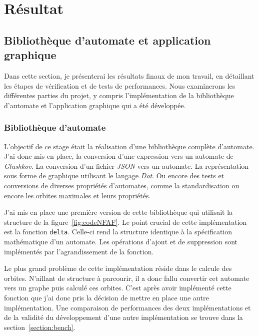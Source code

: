 \section{Résultat}

\subsection{Bibliothèque d'automate et application graphique}

Dans cette section, je présenterai les résultats finaux de mon travail, en
détaillant les étapes de vérification et de tests de performances. Nous
examinerons les différentes parties du projet, y compris l'implémentation de la    
bibliothèque d'automate et l'application graphique qui a été développée.

\subsubsection{Bibliothèque d'automate}

L'objectif de ce stage était la réalisation d'une bibliothèque complète
d'automate. J'ai donc mis en place, la conversion d'une expression vers un
automate de \textit{Glushkov}. La conversion d'un fichier \textit{JSON} vers un
automate. La représentation sous forme de graphique utilisant le langage
\textit{Dot}. Ou encore des tests et conversions de diverses propriétés
d'automates, comme la standardisation ou encore les orbites maximales et leurs
propriétés.

\vphantom{}

J'ai mis en place une première version de cette bibliothèque qui utilisait la
structure de la figure~\ref{fig:codeNFAF}. Le point crucial de cette
implémentation est la fonction \texttt{delta}. Celle-ci rend la
structure identique à la spécification mathématique d'un automate. Les
opérations d'ajout et de suppression sont implémentés par l'agrandissement de
la fonction.

\vphantom{}

Le plus grand problème de cette implémentation réside dans le calcule des
orbites. N'aillant de structure à parcourir, il a donc fallu convertir cet
automate vers un graphe puis calculé ces orbites. C'est après avoir implémenté
cette fonction que j'ai donc pris la décision de mettre en place une autre
implémentation. Une comparaison de performances des deux implémentations et de
la validité du développement d'une autre implémentation se trouve dans la
section~\ref{section:bench}.

